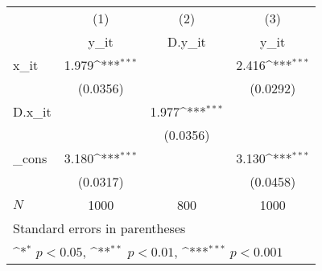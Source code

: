 {
\def\sym#1{\ifmmode^{#1}\else\(^{#1}\)\fi}
\begin{tabular}{l*{3}{c}}
\hline\hline
            &\multicolumn{1}{c}{(1)}&\multicolumn{1}{c}{(2)}&\multicolumn{1}{c}{(3)}\\
            &\multicolumn{1}{c}{y\_it}&\multicolumn{1}{c}{D.y\_it}&\multicolumn{1}{c}{y\_it}\\
\hline
x\_it        &       1.979\sym{***}&                     &       2.416\sym{***}\\
            &    (0.0356)         &                     &    (0.0292)         \\
[1em]
D.x\_it      &                     &       1.977\sym{***}&                     \\
            &                     &    (0.0356)         &                     \\
[1em]
\_cons      &       3.180\sym{***}&                     &       3.130\sym{***}\\
            &    (0.0317)         &                     &    (0.0458)         \\
\hline
\(N\)       &        1000         &         800         &        1000         \\
\hline\hline
\multicolumn{4}{l}{\footnotesize Standard errors in parentheses}\\
\multicolumn{4}{l}{\footnotesize \sym{*} \(p<0.05\), \sym{**} \(p<0.01\), \sym{***} \(p<0.001\)}\\
\end{tabular}
}
